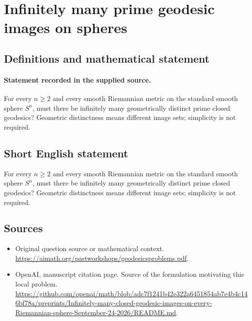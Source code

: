 \documentclass[11pt]{article}
\begin{document}
\section*{Infinitely many prime geodesic images on spheres}\label{statement}
\subsection{Definitions and mathematical statement}
\paragraph{Statement recorded in the supplied source.}
For every $n\geq 2$ and every smooth Riemannian metric on the standard smooth sphere $S^{n}$, must there be infinitely many geometrically distinct prime closed geodesics? Geometric distinctness means different image sets; simplicity is not required.
\subsection{Short English statement}
For every $n\geq 2$ and every smooth Riemannian metric on the standard smooth sphere $S^{n}$, must there be infinitely many geometrically distinct prime closed geodesics? Geometric distinctness means different image sets; simplicity is not required.
\subsection{Sources}
\begin{itemize}
\item[S1] Original question source or mathematical context.
\url{https://aimath.org/pastworkshops/geodesicsproblems.pdf}.
\item[S2] OpenAI, manuscript citation page. Source of the formulation motivating this local problem.
\url{https://github.com/openai/math/blob/adc7f1241b42e322a6451854ab7e4b4c146bf78a/preprints/Infinitely-many-closed-geodesic-images-on-every-Riemannian-sphere-September-24-2026/README.md}.
\end{itemize}
\end{document}
